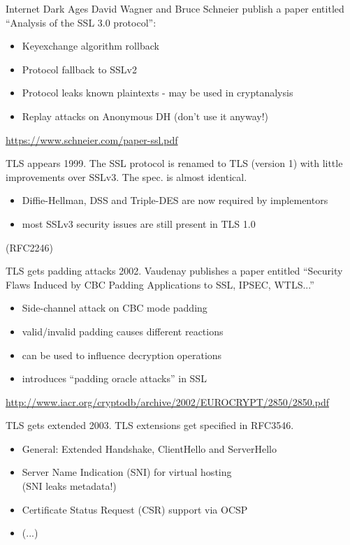 \begin{frame}{Internet Dark Ages}
  David Wagner and Bruce Schneier publish a paper entitled ``Analysis of the SSL 3.0 protocol'':
  \begin{itemize}
    \item Keyexchange algorithm rollback
    \item Protocol fallback to SSLv2
    \item Protocol leaks known plaintexts - may be used in cryptanalysis 
    \item Replay attacks on Anonymous DH (don't use it anyway!)
  \end{itemize}

  \vspace{50px}

  \tiny\url{https://www.schneier.com/paper-ssl.pdf}
\end{frame}

\begin{frame}{TLS appears}
  1999. The SSL protocol is renamed to TLS (version 1) with little improvements over SSLv3. The spec. is almost identical.
  \begin{itemize}
    \item Diffie-Hellman, DSS and Triple-DES are now required by implementors
    \item most SSLv3 security issues are still present in TLS 1.0
  \end{itemize}
  (RFC2246)
\end{frame}

\begin{frame}{TLS gets padding attacks}
  2002. Vaudenay publishes a paper entitled ``Security Flaws Induced by CBC Padding
Applications to SSL, IPSEC, WTLS...'' 
  \begin{itemize}
    \item Side-channel attack on CBC mode padding
    \item valid/invalid padding causes different reactions
    \item can be used to influence decryption operations
    \item introduces ``padding oracle attacks'' in SSL
  \end{itemize}

  \vspace{50px}

  \tiny\url{http://www.iacr.org/cryptodb/archive/2002/EUROCRYPT/2850/2850.pdf}
\end{frame}

\begin{frame}{TLS gets extended}
  2003. TLS extensions get specified in RFC3546.
  \begin{itemize}
    \item General: Extended Handshake, ClientHello and ServerHello
    \item Server Name Indication (SNI) for virtual hosting\\(SNI leaks metadata!)
    \item Certificate Status Request (CSR) support via OCSP
    \item (...)
  \end{itemize}
\end{frame}

